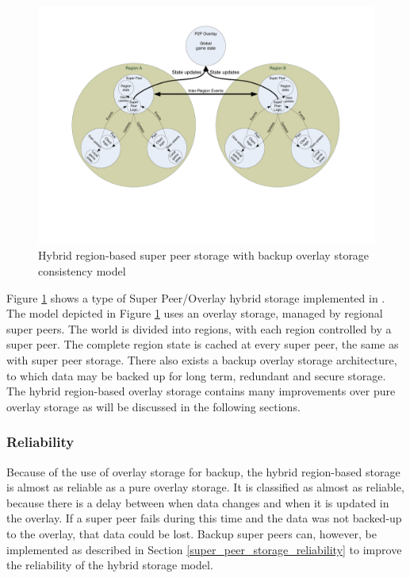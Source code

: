\documentclass[10pt,a4paper,journal,cspaper,compsoc]{IEEEtran}
\begin{document}
\begin{figure}[htbp]
 \centering
 \includegraphics[clip=true, viewport=2cm 5cm 27cm 19.5cm, width=\textwidth]{region_based_CS_CM_P2PO}
 \caption{Hybrid region-based super peer storage with backup overlay storage consistency model}
 \label{fig_cs_region_o_cm}
\end{figure}
%
Figure \ref{fig_cs_region_o_cm} shows a type of Super Peer/Overlay hybrid storage implemented in \cite{zoned_federation}. The model depicted in
Figure \ref{fig_cs_region_o_cm} uses an overlay storage, managed by regional super peers. The world is divided into regions, with each region
controlled by a super peer. The complete region state is cached at every super peer, the same as with super peer storage. There also exists a backup
overlay storage architecture, to which data may be backed up for long term, redundant and secure storage. The hybrid region-based overlay storage
contains many improvements over pure overlay storage as will be discussed in the following sections.

\subsubsection{Reliability}
\label{hybrid_storage_reliability}

Because of the use of overlay storage for backup, the hybrid region-based storage is almost as reliable as a pure overlay storage. It is classified
as almost as reliable, because there is a delay between when data changes and when it is updated in the overlay. If a super peer fails during this
time and the data was not backed-up to the overlay, that data could be lost. Backup super peers can, however, be implemented as described in Section
\ref{super_peer_storage_reliability} to improve the reliability of the hybrid storage model.
\end{document}
